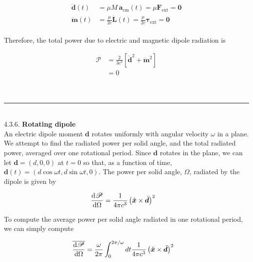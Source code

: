 \documentclass[]{article}
\begin{document}
\begin{equation}
\begin{split}
\ddot{\bm{d}}(t) & =  \mu M \: \bm{a}_\text{cm}(t) = \mu \bm{F}_\text{ext} = \bm{0} \\
\dot{\bm{m}}(t) & = \frac{\mu}{2c} \dot{\bm{L}}(t) =  \frac{\mu}{2c} \bm{\tau}_\text{ext} = \bm{0} \\
\end{split}
\end{equation}

Therefore, the total power due to electric and magnetic dipole radiation is

\begin{equation}
\begin{split}
\mathscr{P} & = \frac{2}{3c^3} \left[ \ddot{\bm{d}}^2 + \ddot{\bm{m}}^2 \right] \\
& = 0 \\
\end{split}
\end{equation}

\hfill \\
\noindent\rule{15cm}{0.4pt} \\

4.3.6. {\bf Rotating dipole} \\

An electric dipole moment $\bm{d}$ rotates uniformly with angular velocity $\omega$ in a plane. We attempt to find the radiated power per solid angle, and the total radiated power, averaged over one rotational period. Since $\bm{d}$ rotates in the plane, we can let $\bm{d} = (d, 0, 0) $ at $t = 0$ so that, as a function of time, $\bm{d}(t) = (d \cos\omega t , d \sin\omega t , 0) $. The power per solid angle, $\Omega$, radiated by the dipole is given by

\begin{equation}
\begin{split}
\dv{\mathscr{P}}{\Omega} & = \frac{1}{4\pi c^3} \left( \hat{\bm{x}} \times \ddot{\bm{d}} \right)^2
\end{split}
\end{equation}

To compute the average power per solid angle radiated in one rotational period, we can simply compute 

\begin{equation}
\begin{split}
\overline{\dv{\mathscr{P}}{\Omega}} & = \frac{\omega}{2\pi} \int_{0}^{2\pi/\omega} dt \frac{1}{4\pi c^3} \left( \hat{\bm{x}} \times \ddot{\bm{d}} \right)^2
\end{split}
\end{equation}
\end{document}

